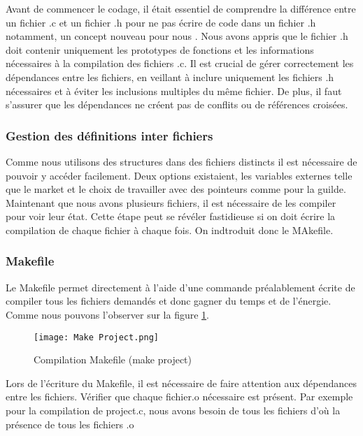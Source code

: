 \documentclass{article}
\begin{document}
\hspace{1em} Avant de commencer le codage, il était essentiel de comprendre la différence entre un fichier .c et un fichier .h pour ne pas écrire de code dans un fichier .h notamment, un concept nouveau pour nous . Nous avons appris que le fichier .h doit contenir uniquement les prototypes de fonctions et les informations nécessaires à la compilation des fichiers .c. Il est crucial de gérer correctement les dépendances entre les fichiers, en veillant à inclure uniquement les fichiers .h nécessaires et à éviter les inclusions multiples du même fichier. De plus, il faut s'assurer que les dépendances ne créent pas de conflits ou de références croisées.


\subsubsection{Gestion des définitions inter fichiers}

\vspace{1em}
\hspace{1em} Comme nous utilisons des structures dans des fichiers distincts il est nécessaire de pouvoir y accéder facilement. Deux options existaient, les variables externes telle que le market et le choix de travailler avec des pointeurs comme pour la guilde.\\ 

Maintenant que nous avons plusieurs fichiers, il est nécessaire de les compiler pour voir leur état. Cette étape peut se révéler fastidieuse si on doit écrire la compilation de chaque fichier à chaque fois. On indtroduit donc le MAkefile.

\subsubsection{Makefile}

\hspace{1em} Le Makefile permet directement à l'aide d'une commande préalablement écrite de compiler tous les fichiers demandés et donc gagner du temps et de l'énergie. Comme nous pouvons l'observer sur la figure \ref{fig:project}.
\begin{figure}[ht]
    \centering
    \texttt{[image: Make Project.png]}
    \caption{Compilation Makefile (make project)}
    \label{fig:project}
\end{figure}

\vspace{1em} Lors de l'écriture du Makefile, il est nécessaire de faire attention aux dépendances entre les fichiers. Vérifier que chaque fichier.o nécessaire est présent. Par exemple pour la compilation de  project.c, nous avons besoin de tous les fichiers d'où la présence de tous les fichiers .o 
\end{document}
